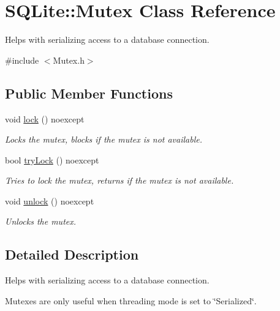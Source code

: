 \hypertarget{a00005}{\section{S\-Q\-Lite\-:\-:Mutex Class Reference}
\label{a00005}
}


Helps with serializing access to a database connection.  




{\ttfamily \#include $<$Mutex.\-h$>$}

\subsection*{Public Member Functions}
\begin{DoxyCompactItemize}
\item 
\hypertarget{a00005_a56ba1f0c1411940ab52279497d15812a}{void \hyperlink{a00005_a56ba1f0c1411940ab52279497d15812a}{lock} () noexcept}\label{a00005_a56ba1f0c1411940ab52279497d15812a}

\begin{DoxyCompactList}\small\item\em Locks the mutex, blocks if the mutex is not available. \end{DoxyCompactList}\item 
bool \hyperlink{a00005_a95b5ebd5fef0bd37b30e3867d60389f8}{try\-Lock} () noexcept
\begin{DoxyCompactList}\small\item\em Tries to lock the mutex, returns if the mutex is not available. \end{DoxyCompactList}\item 
\hypertarget{a00005_ad9238aeb94205ac18d67c9652dcc6ef9}{void \hyperlink{a00005_ad9238aeb94205ac18d67c9652dcc6ef9}{unlock} () noexcept}\label{a00005_ad9238aeb94205ac18d67c9652dcc6ef9}

\begin{DoxyCompactList}\small\item\em Unlocks the mutex. \end{DoxyCompactList}\end{DoxyCompactItemize}


\subsection{Detailed Description}
Helps with serializing access to a database connection. 

Mutexes are only useful when threading mode is set to \char`\"{}\-Serialized\char`\"{}. 

